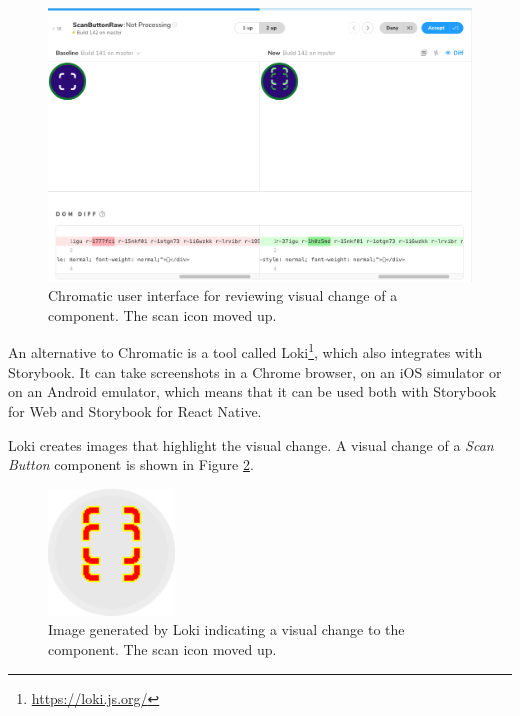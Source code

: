 \documentclass[
  printed, %
  table,   %
  oneside, %
  lof,     %
  lot,     %
]{fithesis3}
\begin{document}
\begin{figure}
    \begin{center}
        \includegraphics[width=\textwidth]{figures/other/chromatic_diff}
    \end{center}
    \caption{Chromatic user interface for reviewing visual change of a component. The scan icon moved up.}
    \label{fig:chromatic_diff}
\end{figure}

An alternative to Chromatic is a tool called Loki\footnote{\url{https://loki.js.org/}}, which also integrates with Storybook. It can take screenshots in a Chrome browser, on an iOS simulator or on an Android emulator, which means that it can be used both with Storybook for Web and Storybook for React Native.

Loki creates images that highlight the visual change. A visual change of a \textit{Scan Button} component is shown in Figure \ref{fig:loki_diff}.

\begin{figure}
    \begin{center}
        \includegraphics[width=0.3\textwidth]{figures/other/loki_diff}
    \end{center}
    \caption{Image generated by Loki indicating a visual change to the component. The scan icon moved up.}
    \label{fig:loki_diff}
\end{figure}
\end{document}
